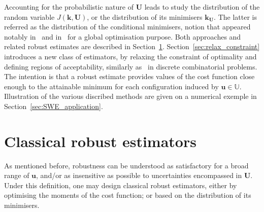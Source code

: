 \documentclass[preprint, 1p]{elsarticle}
\newcommand{\kest}{\hat{\mathbf{k}}}
\newcommand{\Uspace}{\mathbb{U}}
\begin{document}
Accounting for the probabilistic nature of  $\mathbf{U}$ leads to study the distribution of the random variable $J(\mathbf{k},\mathbf{U})$, or the distribution of its minimisers ${\mathbf{k}}_{\mathbf{U}}$. The latter is referred as 
the distribution of the conditional minimisers, notion that appeared notably in~\cite{villemonteix_informational_2006} and in~\cite{hennig_entropy_2011} for a global optimisation purpose. Both approaches and related robust estimates are described in Section~\ref{robust formulations}. Section~\ref{sec:relax_constraint} introduces a new class of estimators, by relaxing the constraint of optimality and defining regions of acceptability, similarly as~\cite{buhmann_robust_2013} in discrete combinatorial problems.  The intention is that a robust estimate provides values of the cost function close enough to the attainable minimum for each configuration induced by $\mathbf{u}\in\Uspace$. Illustration of the various discribed methods are given on a numerical exemple in Section~\ref{sec:SWE_application}.



\section{Classical robust estimators}
\label{robust formulations}

As mentioned before, robustness can be understood as satisfactory for a broad range of $\mathbf{u}$, and/or as insensitive as possible to uncertainties encompassed in $\mathbf{U}$. Under this definition, one may design classical robust estimators, either by optimising the moments of the cost function; or based on the distribution of its minimisers.


%
\end{document}
